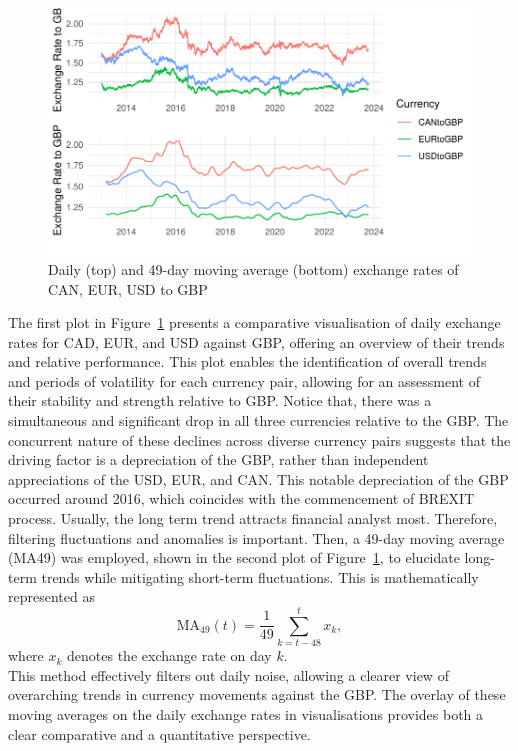 \documentclass{article}\usepackage[]{graphicx}\usepackage[]{xcolor}
\makeatletter
\def\maxwidth{ %
  \ifdim\Gin@nat@width>\linewidth
    \linewidth
  \else
    \Gin@nat@width
  \fi
}
\newenvironment{knitrout}{}{} %
\makeatother
\begin{document}
\begin{figure}[H]
\begin{knitrout}
{\centering \includegraphics[width=\maxwidth]{figure/beamer-unnamed-chunk-2-1} 

}


\end{knitrout}
\centering
\caption{Daily (top) and 49-day moving average (bottom) exchange rates of CAN, EUR, USD to GBP}
\label{fig:all exchange rates}
\end{figure}

\noindent
The first plot in Figure~\ref{fig:all exchange rates} presents a comparative visualisation of daily exchange rates for CAD, EUR, and USD against GBP, offering an overview of their trends and relative performance. This plot enables the identification of overall trends and periods of volatility for each currency pair, allowing for an assessment of their stability and strength relative to GBP. Notice that, there was a simultaneous and significant drop in all three currencies relative to the GBP. The concurrent nature of these declines across diverse currency pairs suggests that the driving factor is a depreciation of the GBP, rather than independent appreciations of the USD, EUR, and CAN. This notable depreciation of the GBP occurred around 2016, which coincides with the commencement of BREXIT process. Usually, the long term trend attracts financial analyst most. Therefore, filtering fluctuations and anomalies is important. Then, a 49-day moving average (MA49) was employed, shown in the second plot of Figure~\ref{fig:all exchange rates}, to elucidate long-term trends while mitigating short-term fluctuations. This is mathematically represented as 
\[\text{MA}_{49}(t) = \frac{1}{49} \sum_{k=t-48}^{t} x_k,\] 
where \( x_k \) denotes the exchange rate on day $k$.\\

\noindent
This method effectively filters out daily noise, allowing a clearer view of overarching trends in currency movements against the GBP. The overlay of these moving averages on the daily exchange rates in visualisations provides both a clear comparative and a quantitative perspective.\\
\end{document}

